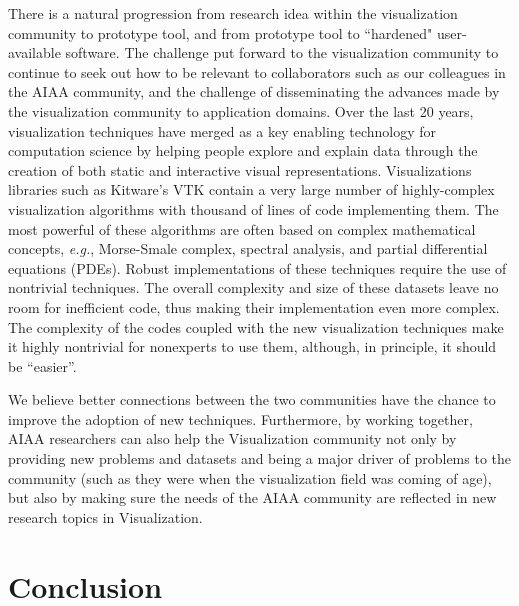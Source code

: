 There is a natural progression from research idea within the 
visualization community to prototype tool,  and from prototype tool to 
``hardened" user-available software.  The challenge put forward to the 
visualization community to continue to seek out how to be relevant to 
collaborators such as our colleagues in the AIAA community, and
the challenge of disseminating the advances made by the visualization 
community to application domains.
Over the last 20 years, visualization techniques have merged as a
key enabling technology for computation science by helping people
explore and explain data through the creation of both static and
interactive visual representations. Visualizations libraries such as
Kitware's VTK contain a very large number of highly-complex
visualization algorithms with thousand of lines of code implementing
them. 
The most powerful of these algorithms are often based on complex
mathematical concepts, {\em e.g.}, Morse-Smale complex, spectral
analysis, and partial differential equations (PDEs). Robust
implementations of these techniques require the use of nontrivial
techniques. The overall complexity and size of these datasets leave no
room for inefficient code, thus making their implementation even more
complex. The complexity of the codes coupled with the new
visualization techniques make it highly nontrivial for nonexperts to
use them, although, in principle, it should be ``easier''. 

We believe better connections between the two communities have the
chance to improve the adoption of new techniques.  Furthermore, by
working together, AIAA researchers can also help the Visualization community not
only by providing new problems and datasets and being a major driver of
problems to the community (such as they were when the visualization
field was coming of age), but also by making sure the needs of the
AIAA community are reflected in new research topics in Visualization.


\section{Conclusion}
\label{sec:conclusions}

